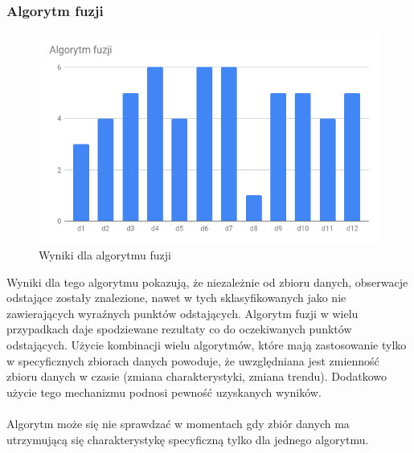 \documentclass[eng,printmode]{mgr}
\begin{document}
\subsubsection{Algorytm fuzji}
\begin{figure}[H]
  \begin{center}
  \includegraphics[scale=0.7]{r_fusion}
  \end{center}
  \caption{Wyniki dla algorytmu fuzji}
  \label{fig:r_fusion}
\end{figure}
Wyniki dla tego algorytmu pokazują, że niezależnie od zbioru danych, obserwacje odstające zostały znalezione, nawet w tych sklasyfikowanych jako nie zawierających wyraźnych punktów odstających. Algorytm fuzji w wielu przypadkach daje spodziewane rezultaty co do oczekiwanych punktów odstających. Użycie kombinacji wielu algorytmów, które mają zastosowanie tylko w specyficznych zbiorach danych powoduje, że uwzględniana jest zmienność zbioru danych w czasie (zmiana charakterystyki, zmiana trendu). Dodatkowo użycie tego mechanizmu podnosi pewność uzyskanych wyników.
\\\\
Algorytm może się nie sprawdzać w momentach gdy zbiór danych ma utrzymującą się charakterystykę specyficzną tylko dla jednego algorytmu.
\end{document}
